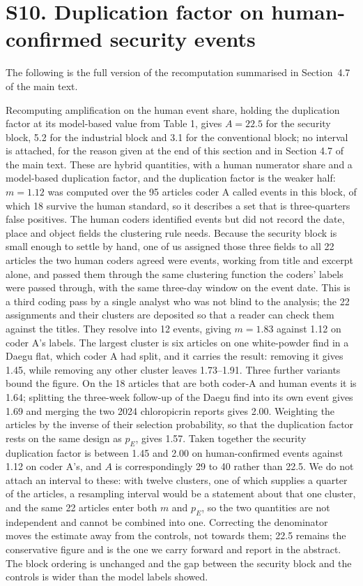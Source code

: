 \documentclass[11pt]{article}
\begin{document}
\section*{S10. Duplication factor on human-confirmed security events}
The following is the full version of the recomputation summarised in Section~4.7 of the main text.

Recomputing amplification on the human event share, holding the duplication factor at its model-based value from Table 1, gives $A = 22.5$ for the security block, 5.2 for the industrial block and 3.1 for the conventional block; no interval is attached, for the reason given at the end of this section and in Section 4.7 of the main text. These are hybrid quantities, with a human numerator share and a model-based duplication factor, and the duplication factor is the weaker half: $m = 1.12$ was computed over the 95 articles coder A called events in this block, of which 18 survive the human standard, so it describes a set that is three-quarters false positives. The human coders identified events but did not record the date, place and object fields the clustering rule needs. Because the security block is small enough to settle by hand, one of us assigned those three fields to all 22 articles the two human coders agreed were events, working from title and excerpt alone, and passed them through the same clustering function the coders' labels were passed through, with the same three-day window on the event date. This is a third coding pass by a single analyst who was not blind to the analysis; the 22 assignments and their clusters are deposited so that a reader can check them against the titles. They resolve into 12 events, giving $m = 1.83$ against 1.12 on coder A's labels. The largest cluster is six articles on one white-powder find in a Daegu flat, which coder A had split, and it carries the result: removing it gives 1.45, while removing any other cluster leaves 1.73--1.91. Three further variants bound the figure. On the 18 articles that are both coder-A and human events it is 1.64; splitting the three-week follow-up of the Daegu find into its own event gives 1.69 and merging the two 2024 chloropicrin reports gives 2.00. Weighting the articles by the inverse of their selection probability, so that the duplication factor rests on the same design as $p_E$, gives 1.57. Taken together the security duplication factor is between 1.45 and 2.00 on human-confirmed events against 1.12 on coder A's, and $A$ is correspondingly 29 to 40 rather than 22.5. We do not attach an interval to these: with twelve clusters, one of which supplies a quarter of the articles, a resampling interval would be a statement about that one cluster, and the same 22 articles enter both $m$ and $p_E$, so the two quantities are not independent and cannot be combined into one. Correcting the denominator moves the estimate away from the controls, not towards them; 22.5 remains the conservative figure and is the one we carry forward and report in the abstract. The block ordering is unchanged and the gap between the security block and the controls is wider than the model labels showed.
\end{document}
